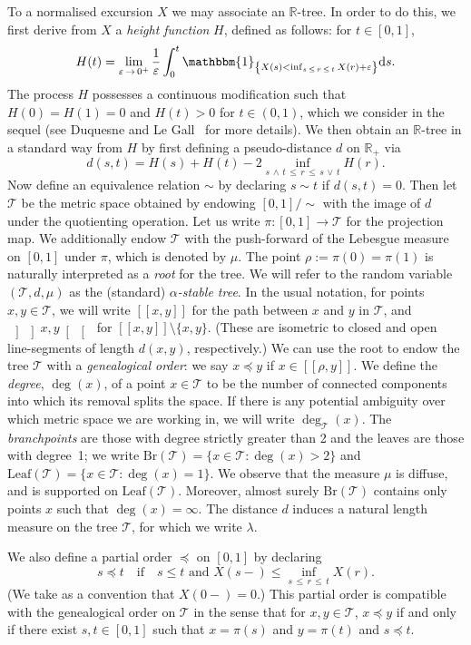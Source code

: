 \documentclass[AHL,Unicode,longabstracts,published]{cedram}
\newcommand{\I}[1]{\ensuremath{\mathbbm{1}_{ \left\{ #1 \right\} }}}
\newcommand{\seg}[2]{\left[\! \left[#1, #2 \right] \! \right]}
\newcommand{\oseg}[2]{\, \left] \! \left] #1, #2 \right[\! \right[\,}
\newcommand{\Br}{\mathrm{Br}}
\newcommand{\rmd}{\mathrm{d}}
\newcommand{\Leaf}{\mathrm{Leaf}}
\newcommand{\cT}{\mathcal{T}}
\newcommand{\R}{\mathbb{R}}
\newcommand{\R}{\mathbb{R}}
\begin{document}
To a normalised excursion $X$ we may associate an $\R$-tree. In order to do this, we first derive from $X$ a \emph{height function} $H$, defined as follows: for $t \in [0,1]$,
\[
H(t) = \lim_{\varepsilon\,\to\,0^+} \frac{1}{\varepsilon} \int_0^t \I{X(s) < \inf_{s\,\le\,r\,\le \,t}X(r) + \varepsilon} \rmd s.
\]
The process $H$ possesses a continuous modification such that $H(0) = H(1) = 0$ and $H(t) > 0$ for $t \in (0,1)$, which we consider in the sequel (see Duquesne and Le Gall~\cite{DuquesneLeGall} for more details). We then obtain an $\R$-tree in a standard way from $H$ by first defining a pseudo-distance $d$ on $\R_+$ via
\[
d(s,t) = H(s) + H(t) - 2 \inf_{s\,\wedge\,t\,\le\,r \,\le\,s\,\vee\,t} H(r).
\]
Now define an equivalence relation $\sim$ by declaring $s \sim t$ if $d(s,t) = 0$. Then let $\cT$ be the metric space obtained by endowing $[0,1]/\sim$ with the image of $d$ under the quotienting operation. Let us write $\pi: [0,1] \to \cT$ for the projection map. We additionally endow $\cT$ with the push-forward of the Lebesgue measure on $[0,1]$ under $\pi$, which is denoted by $\mu$. The point $\rho := \pi(0) = \pi(1)$ is naturally interpreted as a \emph{root} for the tree. We will refer to the random variable $(\cT,d,\mu)$ as the (standard) \emph{$\alpha$-stable tree}. In the usual notation, for points $x,y \in \cT$, we will write $\seg{x}{y}$ for the path between $x$ and $y$ in $\cT$, and $\oseg{x}{y}$ for $\seg{x}{y} \setminus \{x,y\}$. (These are isometric to closed and open line-segments of length $d(x,y)$, respectively.) We can use the root to endow the tree $\cT$ with a \emph{genealogical order}: we say $x \preceq y$ if $x \in \seg{\rho}{y}$. We define the \emph{degree}, $\deg(x)$, of a point $x \in \cT$ to be the number of connected components into which its removal splits the space. If there is any potential ambiguity over which metric space we are working in, we will write $\deg_{\cT}(x)$. The \emph{branchpoints} are those with degree strictly greater than 2 and the leaves are those with degree~1; we write $\Br(\cT) = \{x \in \cT: \deg(x) > 2\}$ and $\Leaf(\cT) = \{x \in \cT: \deg(x) = 1\}$. We observe that the measure $\mu$ is diffuse, and is supported on $\Leaf(\cT)$. Moreover, almost surely $\Br(\cT)$ contains only points $x$ such that $\deg(x) = \infty$. The distance $d$ induces a natural length measure on the tree $\cT$, for which we write $\lambda$.


We also define a partial order $\preceq$ on $[0,1]$ by declaring
\begin{equation}\label{def:partial order on 0,1}
s \preceq t \quad \text{if} \quad s \le t \text{ and } X(s-) \leq \inf_{s\,\le\,r\,\le\,t} X(r).
\end{equation}
(We take as a convention that $X(0-) = 0$.) This partial order is compatible with the genealogical order on $\cT$ in the sense that for $x,y \in \cT$, $x \preceq y$ if and only if there exist $s,t \in [0,1]$ such that $x = \pi(s)$ and $y = \pi(t)$ and $s \preceq t$.
\end{document}
